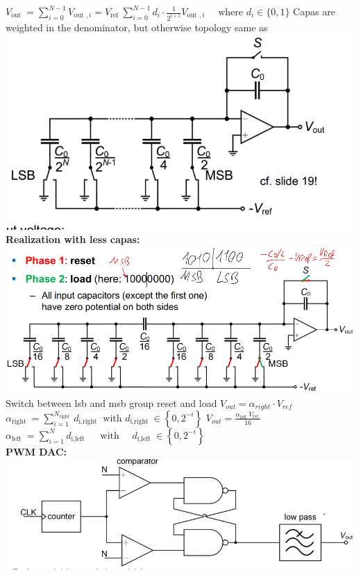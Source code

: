 \documentclass[5pt]{article}
\begin{document}
\begin{multicols*}{4}
$ V_{\text {out }}=\sum_{i=0}^{N-1} V_{\text {out }, i}=V_{\text {ref }} \sum_{i=0}^{N-1} d_{i} \cdot \frac{1}{2^{i+1}} V_{\text {out }, i} \quad \text { where } d_{i} \in\{0,1\} $
Capas are weighted in the denominator, but otherwise topology same as 
\includegraphics[width=\columnwidth]{images/dac_capa_volt_div.png}
\textbf{Realization with less capas:}\\
\includegraphics[width=\columnwidth]{images/dac_less_capa.png}\\
Switch between lsb and msb group reset and load
$ V_{out} = \alpha_{right} \cdot V_{ref} $
$ \alpha_{\text {right }}=\sum_{i=1}^{N_{\text {right }}} d_{\text {i,right }} \text { with } d_{\text {i,right }} \in\left\{0,2^{-i}\right\} $
$ V_{out} =\frac{\alpha_{\text {left }} V_{\text {ref }}}{16} $\\
$ \alpha_{\text {left }}=\sum_{i=1}^{N} d_{\text {i,left }} \quad \text { with } \quad d_{\text {i,left }} \in\left\{0,2^{-i}\right\} $\\
\textbf{PWM DAC:}\\
\includegraphics[width=\columnwidth]{images/dac_pwm.png}\\

\end{multicols*}
\end{document}
